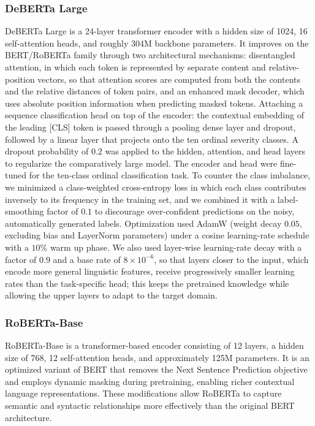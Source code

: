 \documentclass[conference]{IEEEtran}
\begin{document}
\subsubsection{\textbf{DeBERTa Large}}
DeBERTa Large \cite{he2021deberta} is a 24-layer transformer encoder with a
hidden size of 1024, 16 self-attention heads, and roughly 304M backbone
parameters. It improves on the BERT/RoBERTa family through two architectural
mechanisms: disentangled attention, in which each token is represented by
separate content and relative-position vectors, so that attention scores are
computed from both the contents and the relative distances of token pairs, and an enhanced mask decoder, which uses absolute position information when predicting masked tokens. Attaching a sequence classification head on top of the encoder: the contextual embedding of the leading [CLS] token is passed through a pooling dense layer and dropout, followed by a linear layer that projects onto the ten ordinal severity classes. A dropout probability of $0.2$ was applied to the hidden, attention, and head layers to regularize the comparatively large model. 
The encoder and head were fine-tuned for the ten-class ordinal classification task. To counter the class imbalance, we minimized a class-weighted cross-entropy loss in which each class contributes inversely to its frequency in the training set, and we combined it with a label-smoothing factor of $0.1$ to discourage over-confident predictions on the noisy, automatically generated labels. Optimization used AdamW (weight decay $0.05$, excluding bias and LayerNorm parameters) under a cosine learning-rate schedule with a $10\%$ warm up phase. We also used layer-wise learning-rate decay with a factor of $0.9$ and a base rate of $8\times10^{-6}$, so that layers closer to the input, which encode more general linguistic features, receive progressively smaller learning rates than the task-specific head; this keeps the pretrained knowledge while allowing the upper layers to adapt to the target domain. 


\subsubsection{\textbf{RoBERTa-Base}}
RoBERTa-Base \cite{DBLP:journals/corr/abs-1907-11692} is a transformer-based encoder consisting of 12 layers, a hidden size of 768, 12 self-attention heads, and approximately 125M parameters. It is an optimized variant of BERT that removes the Next Sentence Prediction objective and employs dynamic masking during pretraining, enabling richer contextual language representations. These modifications allow RoBERTa to capture semantic and syntactic relationships more effectively than the original BERT architecture.
\end{document}
